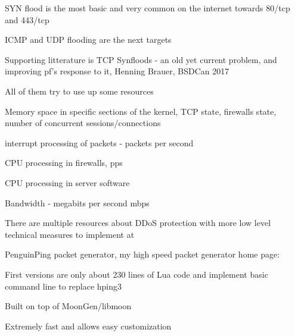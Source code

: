 \documentclass[Screen16to9,17pt]{foils}
\begin{document}
\begin{list2}
\item SYN flood is the most basic and very common on the internet towards 80/tcp and 443/tcp
\item ICMP and UDP flooding are the next targets
\item Supporting litterature is TCP Synfloods - an old yet current problem, and improving pf's response to it, Henning Brauer, BSDCan 2017
\item All of them try to use up some resources
\begin{list2}
\item Memory space in specific sections of the kernel, TCP state, firewalls state, number of concurrent sessions/connections
\item interrupt processing of packets - packets per second
\item CPU processing in firewalls, pps
\item CPU processing in server software
\item Bandwidth - megabits per second mbps
\end{list2}
\end{list2}

There are multiple resources about DDoS protection with more low level technical measures to implement at\\
{\footnotesize {}}




\begin{list2}
\item PenguinPing packet generator, my high speed packet generator
home page: 
\item First versions are only about 230 lines of Lua code and implement basic command line to replace hping3
\item Built on top of MoonGen/libmoon 
\end{list2}

\centerline{Extremely fast and allows easy customization}


\end{document}
